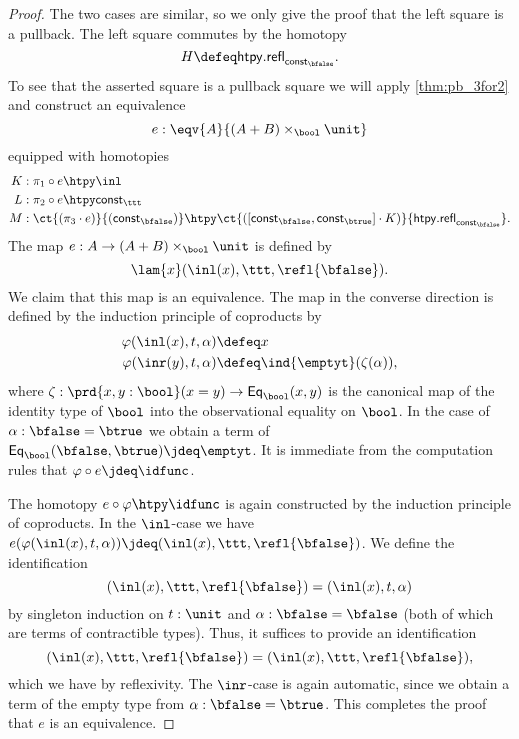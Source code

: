 \begin{proof}
The two cases are similar, so we only give the proof that the left square is a pullback. The left square commutes by the homotopy
\begin{equation*}
H\defeq \mathsf{htpy.refl}_{\mathsf{const}_{\bfalse}}.
\end{equation*}
To see that the asserted square is a pullback square we will apply \cref{thm:pb_3for2} and construct an equivalence
\begin{equation*}
e:\eqv{A}{(A+B)\times_\bool\unit}
\end{equation*}
equipped with homotopies
\begin{align*}
K & : \pi_1\circ e\htpy \inl \\
L & : \pi_2\circ e\htpy \mathsf{const}_\ttt \\
M & : \ct{(\pi_3\cdot e)}{(\mathsf{const}_{\bfalse})}\htpy \ct{({[\mathsf{const}_{\bfalse},\mathsf{const}_{\btrue}]}\cdot K)}{\mathsf{htpy.refl}_{\mathsf{const}_{\bfalse}}}.
\end{align*}
The map $e:A\to (A+B)\times_\bool\unit$ is defined by
\begin{equation*}
\lam{x}(\inl(x),\ttt,\refl{\bfalse}).
\end{equation*}
We claim that this map is an equivalence. The map in the converse direction is defined by the induction principle of coproducts by
\begin{align*}
\varphi(\inl(x),t,\alpha) & \defeq x \\
\varphi(\inr(y),t,\alpha) & \defeq \ind{\emptyt}(\zeta(\alpha)),
\end{align*}
where $\zeta:\prd{x,y:\bool}(x=y)\to \mathsf{Eq}_\bool(x,y)$ is the canonical map of the identity type of $\bool$ into the observational equality on $\bool$. In the case of $\alpha:\bfalse=\btrue$ we obtain a term of $\mathsf{Eq}_\bool(\bfalse,\btrue)\jdeq \emptyt$. It is immediate from the computation rules that $\varphi\circ e\jdeq \idfunc$. 

The homotopy $e\circ \varphi\htpy \idfunc$ is again constructed by the induction principle of coproducts. In the $\inl$-case we have $e(\varphi(\inl(x),t,\alpha))\jdeq (\inl(x),\ttt,\refl{\bfalse})$. We define the identification
\begin{equation*}
(\inl(x),\ttt,\refl{\bfalse})=(\inl(x),t,\alpha)
\end{equation*}
by singleton induction on $t:\unit$ and $\alpha:\bfalse=\bfalse$ (both of which are terms of contractible types). Thus, it suffices to provide an identification
\begin{equation*}
(\inl(x),\ttt,\refl{\bfalse})=(\inl(x),\ttt,\refl{\bfalse}),
\end{equation*}
which we have by reflexivity. The $\inr$-case is again automatic, since we obtain a term of the empty type from $\alpha:\bfalse=\btrue$. This completes the proof that $e$ is an equivalence. 


\end{proof}
